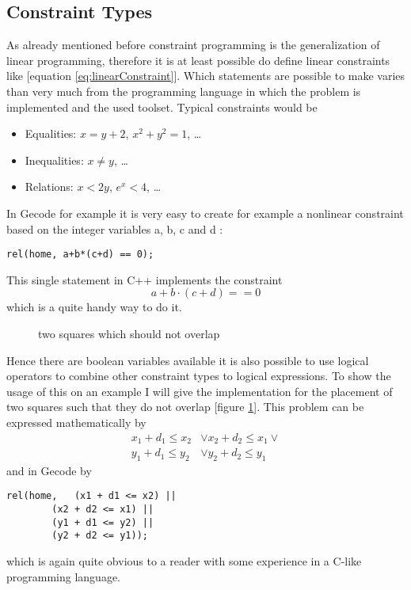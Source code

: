 \documentclass[10pt,
               a4paper,
               journal,
               ]{IEEEtran}
\begin{document}
	\subsection{Constraint Types}
	As already mentioned before constraint programming is the generalization of linear programming, therefore it is at least possible do define linear constraints like [equation \ref{eq:linearConstraint}]. Which statements are possible to make varies than very much from the programming language in which the problem is implemented and the used toolset. Typical constraints would be
	\begin{itemize}
		\item Equalities: $x = y + 2$, $x^2 + y^2 = 1$, \dots
		\item Inequalities: $x \ne y$, \dots
		\item Relations: $x < 2 y$, $e^x < 4$, \dots
	\end{itemize}
	In Gecode for example it is very easy to create for example a nonlinear constraint based on the integer variables a, b, c and d \cite[p. 120]{programmingGecode}:
	\begin{lstlisting}
rel(home, a+b*(c+d) == 0);
	\end{lstlisting}
	This single statement in C++ implements the constraint
	\begin{equation}
		a + b \cdot (c + d) == 0
	\end{equation}
	which is a quite handy way to do it.
	
	\begin{figure}
	\center
	\caption{two squares which should not overlap}
	\label{fig:squares}
	\end{figure}
	Hence there are boolean variables available it is also possible to use logical operators to combine other constraint types to logical expressions. To show the usage of this on an example I will give the implementation for the placement of two squares such that they do not overlap [figure \ref{fig:squares}]. This problem can be expressed mathematically by \cite[p. 101]{programmingGecode}
	\begin{equation}
	\begin{split}
		x_1 + d_1 \le x_2 & \lor x_2 + d_2 \le x_1 \lor \\
		y_1 + d_1 \le y_2 & \lor y_2 + d_2 \le y_1
	\end{split}
	\end{equation}
	and in Gecode by
	\begin{lstlisting}
rel(home,	(x1 + d1 <= x2) || 
		(x2 + d2 <= x1) || 
		(y1 + d1 <= y2) || 
		(y2 + d2 <= y1));
	\end{lstlisting}
	which is again quite obvious to a reader with some experience in a C-like programming language.	
	
\end{document}
